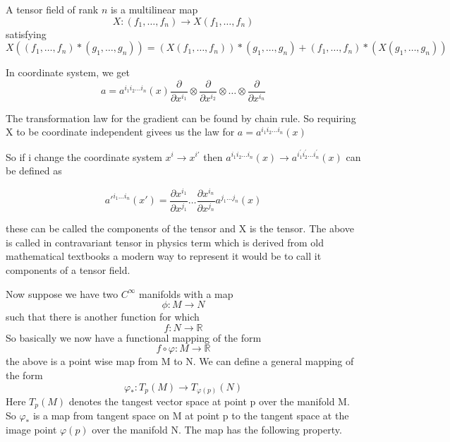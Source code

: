 \documentclass{article}
\begin{document}
\begin{theorem}
    
 A tensor field of rank $n$ is a multilinear map
\begin{equation}
X : (f_1, \ldots, f_n) \to X(f_1, \ldots, f_n)
\end{equation}
satisfying
\begin{equation}
X((f_1, \ldots, f_n) \ast (g_1, \ldots, g_n)) = (X(f_1, \ldots, f_n)) \ast (g_1, \ldots, g_n) + (f_1, \ldots, f_n) \ast (X(g_1, \ldots, g_n))
\end{equation}

\end{theorem}
In coordinate system, we get 
\begin{equation}
a = a^{i_1 i_2 \ldots i_n}(x) \frac{\partial}{\partial x^{i_1}} \otimes \frac{\partial}{\partial x^{i_2}} \otimes \ldots \otimes \frac{\partial}{\partial x^{i_n}}
\end{equation}

The transformation law for the gradient can be found by chain rule. So requiring X to be coordinate independent givees us the law for $ a = a^{i_1 i_2 \ldots i_n}(x) $

So if i change the coordinate system \( x^i \to x^{i'} \) then  $ a^{i_1 i_2 \ldots i_n}(x) \to a^{i^{'}_1 i^{'}_2 \ldots i^{'}_n}(x) $ 
can be defined as 

\[ 
a'^{i_1 \ldots i_n}(x') = \frac{\partial x^{i_1}}{\partial x^{j_1}} \ldots \frac{\partial x^{i_n}}{\partial x^{j_n}} a^{j_1 \ldots j_n}(x)
\] 

these can be called the components of the tensor and X is the tensor. The above is called in contravariant tensor in physics term which is derived from old mathematical textbooks a modern way to represent it would be to call it components of a tensor field. 

Now suppose we have two \( C^\infty \) manifolds with a map 
\[ \phi:M \to N \] 
such that there is another function for which 
\[ f:N \to \mathbb{R} \]
So basically we now have a functional mapping of the form 
\[ f \circ \varphi :M \to \mathbb{R} \]
the above is a point wise map from M to N. We can define a general mapping of the form 
\[ \varphi_{*} : T_{p} (M) \to T_{\varphi(p)} (N) \]
Here \(T_{p}(M) \) denotes the tangest vector space at point p over the manifold M. So \( \varphi_{*}  \) is a map from tangent space on M at point p to the tangent space at the image point \( \varphi(p) \) over the manifold N. The map has the following property. 
\end{document}
